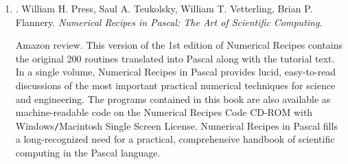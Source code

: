 \documentclass{article}
\begin{document}
\begin{enumerate}
	\item \cite{Press_Teukolsky_Vetterling_Flannery_recipe_Fortran90}. {\sc William H. Press, Saul A. Teukolsky, William T. Vetterling, Brian P. Flannery}. {\it Numerical Recipes in Pascal: The Art of Scientific Computing}. {}
	
	{\sf Amazon review.} This version of the 1st edition of Numerical Recipes contains the original 200 routines translated into Pascal along with the tutorial text. In a single volume, Numerical Recipes in Pascal provides lucid, easy-to-read discussions of the most important practical numerical techniques for science and engineering. The programs contained in this book are also available as machine-readable code on the Numerical Recipes Code CD-ROM with Windows{\tt/}Macintosh Single Screen License. Numerical Recipes in Pascal fills a long-recognized need for a practical, comprehensive handbook of scientific computing in the Pascal language.
	

\end{enumerate}
\end{document}
